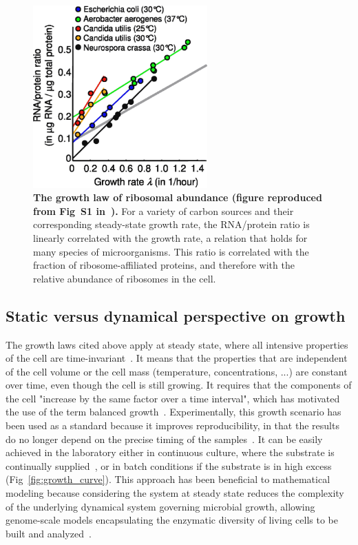 \begin{figure}[tb]
\centering
\includegraphics[height=7cm]{./Fig/Chapter1/scott_rnaprot.eps}
\caption{
\textbf{The growth law of ribosomal abundance (figure reproduced from Fig~S1 in~\cite{scott_interdependence_2010}).}
For a variety of carbon sources and their corresponding steady-state growth rate, the RNA/protein ratio is linearly correlated with the growth rate, a relation that holds for many species of microorganisms.
This ratio is correlated with the fraction of ribosome-affiliated proteins, and therefore with the relative abundance of ribosomes in the cell.
}
\label{fig:scott_rnaprot}
\end{figure}

\subsection{Static versus dynamical perspective on growth}

The growth laws cited above apply at steady state, where all intensive properties of the cell are time-invariant~\cite{schaechter_microbe_2006,fishov_microbial_1995}.
It means that the properties that are independent of the cell volume or the cell mass (temperature, concentrations, ...) are constant over time, even though the cell is still growing.
It requires that the components of the cell "increase by the same factor over a time interval", which has motivated the use of the term balanced growth~\cite{campbell_synchronization_1957}.
Experimentally, this growth scenario has been used as a standard because it improves reproducibility, in that the results do no longer depend on the precise timing of the samples~\cite{schaechter_microbe_2006}.
It can be easily achieved in the laboratory either in continuous culture, where the substrate is continually supplied~\cite{borirak_molecular_2014}, or in batch conditions if the substrate is in high excess (Fig~\ref{fig:growth_curve}).
This approach has been beneficial to mathematical modeling because considering the system at steady state reduces the complexity of the underlying dynamical system governing microbial growth, allowing genome-scale models encapsulating the enzymatic diversity of living cells to be built and analyzed~\cite{orth_what_2010}.

